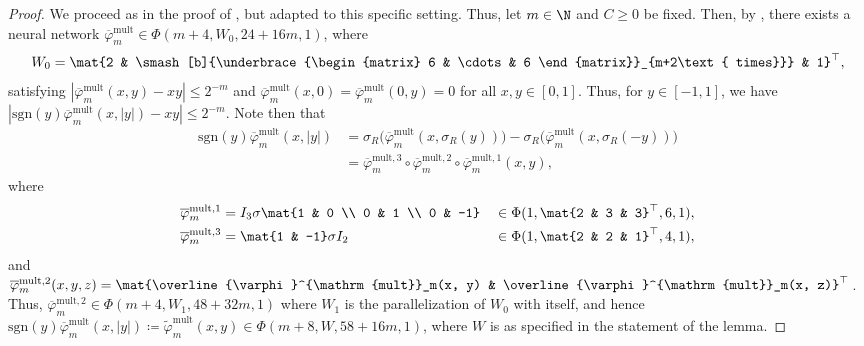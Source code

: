 \documentclass[a4paper, 11pt, headings = small, abstract]{scrartcl}
\begin{document}
\begin{proof}
    We proceed as in the proof of \cite[Lemma F.6]{oko23}, but adapted to this specific setting.
    Thus, let $m\in\N$ and $C\ge0$ be fixed.
    Then, by \cite[Lemma A.2]{schmidthieber20}, there exists a neural network $\overline{\varphi}^{\mathrm{mult}}_m\in\Phi(m+4, W_0, 24+16m, 1)$, where
    \begin{gather*}
        W_0
        =\mat{2 & \smash[b]{\underbrace{\begin{matrix}
            6 & \cdots & 6
        \end{matrix}}_{m+2\text{ times}}} & 1}^\top, \\
    \end{gather*}
    satisfying $|\overline{\varphi}^{\mathrm{mult}}_m(x, y)-xy|\le 2^{-m}$ and $\overline{\varphi}^{\mathrm{mult}}_m(x, 0)=\overline{\varphi}^{\mathrm{mult}}_m(0, y)=0$ for all $x, y\in[0, 1]$.
    Thus, for $y\in[-1, 1]$, we have $|\mathrm{sgn}(y)\overline{\varphi}^{\mathrm{mult}}_m(x, |y|)-xy|\le 2^{-m}$.
    Note then that
    \begin{align*}
        \mathrm{sgn}(y)\overline{\varphi}^{\mathrm{mult}}_m(x, |y|)
        &=\sigma_R\big(\overline{\varphi}^{\mathrm{mult}}_m(x, \sigma_R(y))\big)-\sigma_R\big(\overline{\varphi}^{\mathrm{mult}}_m(x, \sigma_R(-y))\big) \\
        &=\overline{\varphi}^{{\mathrm{mult}}, 3}_m\circ\overline{\varphi}^{{\mathrm{mult}}, 2}_m\circ\overline{\varphi}^{{\mathrm{mult}}, 1}_m(x, y),
    \end{align*}
    where
    \begin{alignat*}{2}
        \overline{\varphi}^{{\mathrm{mult}}, 1}_m
        &=I_3\sigma\mat{1 & 0 \\ 0 & 1 \\ 0 & -1}
        &&\in\Phi(1, \mat{2 & 3 & 3}^\top, 6, 1), \\
        \overline{\varphi}^{{\mathrm{mult}}, 3}_m
        &=\mat{1 & -1}\sigma I_2
        &&\in\Phi(1, \mat{2 & 2 & 1}^\top, 4, 1),
    \end{alignat*}
    and $\overline{\varphi}^{{\mathrm{mult}}, 2}_m(x, y, z)=\mat{\overline{\varphi}^{\mathrm{mult}}_m(x, y) & \overline{\varphi}^{\mathrm{mult}}_m(x, z)}^\top$.
    Thus, $\overline{\varphi}^{{\mathrm{mult}}, 2}_m\in\Phi(m+4, W_1, 48+32m, 1)$ where $W_1$ is the parallelization of $W_0$ with itself, and hence $\mathrm{sgn}(y)\overline{\varphi}^{\mathrm{mult}}_m(x, |y|)\coloneqq\widetilde{\varphi}^{\mathrm{mult}}_m(x, y)\in\Phi(m+8, W, 58+16m, 1)$, where $W$ is as specified in the statement of the lemma.

\end{proof}
\end{document}
